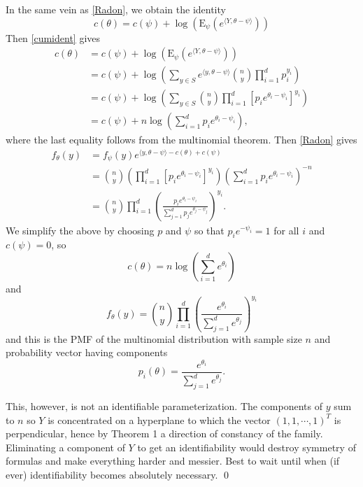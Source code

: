\documentclass[12pt]{article}
\newcommand{\inner}[1]{\langle #1 \rangle}
\begin{document}
In the same vein as \eqref{Radon}, we obtain the identity
\begin{equation} \label{cumident}
	c(\theta) = c(\psi) + \log\left(\mathrm{E}_{\psi}\left(e^{\inner{Y, \theta - \psi}}\right)\right)
\end{equation}
Then \eqref{cumident} gives
\begin{align*}
  c(\theta) &= c(\psi) + \log\left(\mathrm{E}_{\psi}\left(e^{\inner{Y, \theta - \psi}}\right)\right) \\
  &= c(\psi) + \log\left(\sum_{y\in S} e^{\inner{y, \theta - \psi}}{n \choose y} \prod_{i=1}^d p_i^{y_i}\right) \\
  &= c(\psi) + \log\left(\sum_{y\in S} {n \choose y} \prod_{i=1}^d \left[p_ie^{\theta_i - \psi_i}\right]^{y_i}\right) \\  
  &= c(\psi) + n\log\left(\sum_{i=1}^d p_ie^{\theta_i - \psi_i}\right),
\end{align*}
where the last equality follows from the multinomial theorem. Then \eqref{Radon} gives
\begin{align*}
  f_{\theta}(y) &= f_{\psi}(y)e^{\inner{y,\theta-\psi} - c(\theta) + c(\psi)} \\
    &= {n \choose y} \left(\prod_{i=1}^d\left[p_ie^{\theta_i-\psi_i}\right]^{y_i}\right)\left(\sum_{i=1}^d p_ie^{\theta_i-\psi_i}\right)^{-n} \\
    &= {n \choose y} \prod_{i=1}^d \left(\frac{p_ie^{\theta_i-\psi_i}}{\sum_{j=1}^dp_je^{\theta_j-\psi_j}}\right)^{y_i}.
\end{align*}
We simplify the above by choosing $p$ and $\psi$ so that $p_ie^{-\psi_i} = 1$ for all $i$ and $c(\psi) = 0$, so
$$
  c(\theta) = n\log\left(\sum_{i=1}^d e^{\theta_i}\right)
$$
and
$$
  f_{\theta}(y) = {n \choose y}\prod_{i=1}^d \left(\frac{e^{\theta_i}}{\sum_{j=1}^d e^{\theta_j}}\right)^{y_i}
$$
and this is the PMF of the multinomial distribution with sample size $n$ and probability vector having components
$$
  p_i(\theta) = \frac{e^{\theta_i}}{\sum_{j=1}^d e^{\theta_j}}.
$$

This, however, is not an identifiable parameterization. The components of $y$ sum to $n$ so $Y$ is concentrated on a hyperplane to which the vector $(1,1, \cdots, 1)^T$ is perpendicular, hence by Theorem 1 a direction of constancy of the family. Eliminating a component of $Y$ to get an identifiability would destroy symmetry of formulas and make everything harder and messier. Best to wait until when (if ever) identifiability becomes absolutely necessary. \qed
\end{document}
